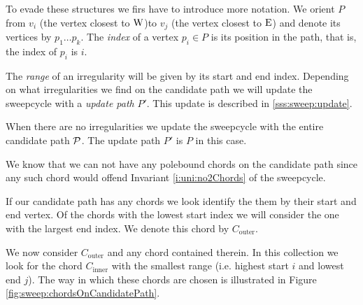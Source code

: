     To evade these structures we firs have to introduce more notation. We orient $P$ from $v_i$ (the vertex closest to $\pW$)to $v_j$ (the vertex closest to $\pE$) and denote its vertices by $p_1 \ldots p_k$. The \emph{index} of a vertex $p_i \in P$ is its position in the path, that is, the index of $p_i$ is $i$.

    The \emph{range} of an irregularity will be given by its start and end index. Depending on what irregularities we find on the candidate path we will update the sweepcycle with a \emph{update path} $P'$. This update is described in \ref{sss:sweep:update}.

      When there are no irregularities we update the sweepcycle with the entire candidate path $\P$. The update path $P'$ is $P$ in this case.

    We know that we can not have any polebound chords on the candidate path since any such chord would offend Invariant \ref{i:uni:no2Chords} of the sweepcycle.

    If our candidate path has any chords we look identify the them by their start and end vertex. Of the chords with the lowest start index we will consider the one with the largest end index. We denote this chord by $C_\text{outer}$.

    We now consider $C_\text{outer}$ and any chord contained therein. In this collection we look for the chord $C_\text{inner}$ with the smallest range (i.e. highest start $i$ and lowest end $j$).
    The way in which these chords are chosen is illustrated in Figure \ref{fig:sweep:chordsOnCandidatePath}.

